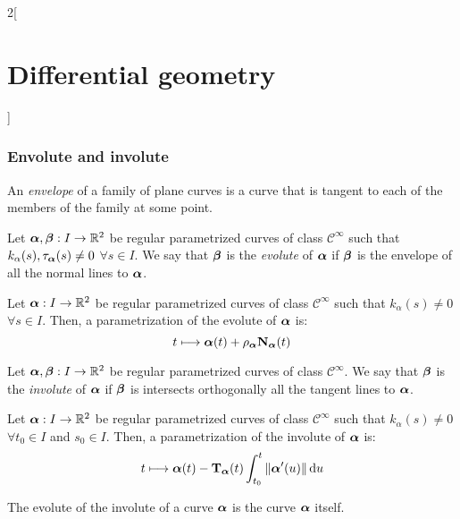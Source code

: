\documentclass[../../../main.tex]{subfiles}
\begin{document}
\begin{multicols}{2}[\section{Differential geometry}]
  \subsubsection{Envolute and involute}
  \begin{definition}
    An \emph{envelope} of a family of plane curves is a curve that is tangent to each of the members of the family at some point.
  \end{definition}
  \begin{definition}
    Let $\boldsymbol{\mathrm{\alpha}},\boldsymbol{\mathrm{\beta}}:I\rightarrow\mathbb{R}^2$ be regular parametrized curves of class $\mathcal{C}^\infty$ such that $k_\alpha(s),{\tau_{\boldsymbol{\mathrm{\alpha}}}}(s)\ne 0$ $\forall s\in I$. We say that $\boldsymbol{\mathrm{\beta}}$ is the \emph{evolute} of $\boldsymbol{\mathrm{\alpha}}$ if $\boldsymbol{\mathrm{\beta}}$ is the envelope of all the normal lines to $\boldsymbol{\mathrm{\alpha}}$.
  \end{definition}
  \begin{proposition}
    Let $\boldsymbol{\mathrm{\alpha}}:I\rightarrow\mathbb{R}^2$ be regular parametrized curves of class $\mathcal{C}^\infty$ such that $k_\alpha(s)\ne 0$ $\forall s\in I$. Then, a parametrization of the evolute of $\boldsymbol{\mathrm{\alpha}}$ is: $$t\longmapsto \boldsymbol{\mathrm{\alpha}}(t)+{\rho_{\boldsymbol{\mathrm{\alpha}}}}{\boldsymbol{\mathrm{N}}_{\boldsymbol{\mathrm{\alpha}}}}(t)$$
  \end{proposition}
  \begin{definition}
    Let $\boldsymbol{\mathrm{\alpha}},\boldsymbol{\mathrm{\beta}}:I\rightarrow\mathbb{R}^2$ be regular parametrized curves of class $\mathcal{C}^\infty$. We say that $\boldsymbol{\mathrm{\beta}}$ is the \emph{involute} of $\boldsymbol{\mathrm{\alpha}}$ if $\boldsymbol{\mathrm{\beta}}$ is intersects orthogonally all the tangent lines to $\boldsymbol{\mathrm{\alpha}}$.
  \end{definition}
  \begin{proposition}
    Let $\boldsymbol{\mathrm{\alpha}}:I\rightarrow\mathbb{R}^2$ be regular parametrized curves of class $\mathcal{C}^\infty$ such that $k_\alpha(s)\ne 0$ $\forall t_0\in I$ and $s_0\in I$. Then, a parametrization of the involute of $\boldsymbol{\mathrm{\alpha}}$ is: $$t\longmapsto \boldsymbol{\mathrm{\alpha}}(t)-{\boldsymbol{\mathrm{T}}_{\boldsymbol{\mathrm{\alpha}}}}(t) \int_{t_0}^t\|\boldsymbol{\mathrm{\alpha}}'(u)\|\dd{u}$$
  \end{proposition}
  \begin{proposition}
    The evolute of the involute of a curve $\boldsymbol{\mathrm{\alpha}}$ is the curve $\boldsymbol{\mathrm{\alpha}}$ itself.
  \end{proposition}
  \begin{center}
    \begin{minipage}{\linewidth}
      \centering
      
    \end{minipage}
  \end{center}

\end{multicols}
\end{document}
